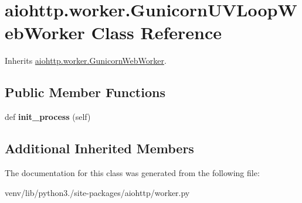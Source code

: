 \hypertarget{classaiohttp_1_1worker_1_1_gunicorn_u_v_loop_web_worker}{}\section{aiohttp.\+worker.\+Gunicorn\+U\+V\+Loop\+Web\+Worker Class Reference}
\label{classaiohttp_1_1worker_1_1_gunicorn_u_v_loop_web_worker}


Inherits \hyperlink{classaiohttp_1_1worker_1_1_gunicorn_web_worker}{aiohttp.\+worker.\+Gunicorn\+Web\+Worker}.

\subsection*{Public Member Functions}
\begin{DoxyCompactItemize}
\item 
\mbox{\label{classaiohttp_1_1worker_1_1_gunicorn_u_v_loop_web_worker_ab6ca6c82abb6086c35b956c74189be70}} 
def {\bfseries init\+\_\+process} (self)
\end{DoxyCompactItemize}
\subsection*{Additional Inherited Members}


The documentation for this class was generated from the following file\+:\begin{DoxyCompactItemize}
\item 
venv/lib/python3./site-\/packages/aiohttp/worker.\+py\end{DoxyCompactItemize}
